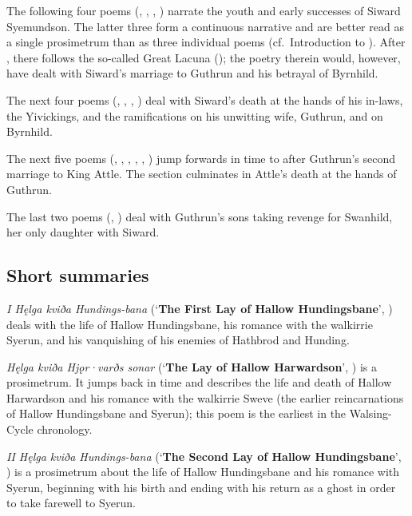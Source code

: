 The following four poems (, , , ) narrate the youth and early successes of Siward Syemundson.  The latter three form a continuous narrative and are better read as a single prosimetrum than as three individual poems (cf.~Introduction to ).
After , there follows the so-called Great Lacuna (); the poetry therein would, however, have dealt with Siward’s marriage to Guthrun and his betrayal of Byrnhild.

The next four poems (, , , ) deal with Siward’s death at the hands of his in-laws, the Yivickings, and the ramifications on his unwitting wife, Guthrun, and on Byrnhild.

The next five poems (, , , , , ) jump forwards in time to after Guthrun’s second marriage to King Attle.  The section culminates in Attle’s death at the hands of Guthrun.

The last two poems (, ) deal with Guthrun’s sons taking revenge for Swanhild, her only daughter with Siward.

\subsection{Short summaries}

\emph{I Hęlga kviða Hundings-bana} (‘\textbf{The First Lay of Hallow Hundingsbane}’, ) deals with the life of Hallow Hundingsbane, his romance with the walkirrie Syerun, and his vanquishing of his enemies of Hathbrod and Hunding.

\emph{Hęlga kviða Hjǫr·varðs sonar} (‘\textbf{The Lay of Hallow Harwardson}’, ) is a prosimetrum.  It jumps back in time and describes the life and death of Hallow Harwardson and his romance with the walkirrie Sweve (the earlier reincarnations of Hallow Hundingsbane and Syerun); this poem is the earliest in the Walsing-Cycle chronology.

\emph{II Hęlga kviða Hundings-bana} (‘\textbf{The Second Lay of Hallow Hundingsbane}’, ) is a prosimetrum about the life of Hallow Hundingsbane and his romance with Syerun, beginning with his birth and ending with his return as a ghost in order to take farewell to Syerun.

